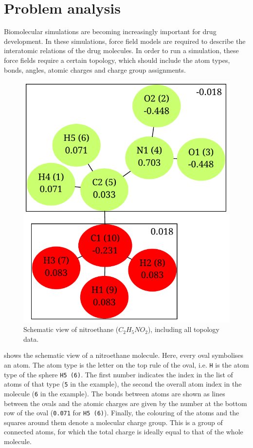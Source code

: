 \chapter{Problem analysis}

Biomolecular simulations are becoming increasingly important for drug development. In these simulations, force field models are required to describe the interatomic relations of the drug molecules. In order to run a simulation, these force fields require a certain topology, which should include the atom types, bonds, angles, atomic charges and charge group assignments.


\begin{figure}[h!]
\begin{center}
\includegraphics[width=.4\textwidth]{img/partial_charges.pdf}
\caption{Schematic view of nitroethane ($C_{2}H_{5}NO_{2}$), including all topology data.}
\end{center}
\end{figure}

 shows the schematic view of a nitroethane molecule. Here, every oval symbolises an atom. The atom type is the letter on the top rule of the oval, i.e. \verb|H| is the atom type of the sphere \verb|H5 (6)|. The first number indicates the index in the list of atoms of that type (\verb|5| in the example), the second the overall atom index in the molecule (\verb|6| in the example). The bonds between atoms are shown as lines between the ovals and the atomic charges are given by the number at the bottom row of the oval (\verb|0.071| for \verb|H5 (6)|). Finally, the colouring of the atoms and the squares around them denote a molecular charge group. This is a group of connected atoms, for which the total charge is ideally equal to that of the whole molecule.

